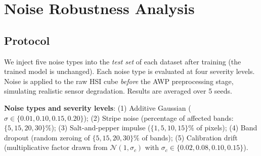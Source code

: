 \documentclass[conference]{IEEEtran}
\begin{document}
\begin{table}[!t]
\caption{Unified Efficiency Comparison}
\label{tab:efficiency_unified}
\centering
{}
\end{table}

\section{Noise Robustness Analysis}

\subsection{Protocol}

We inject five noise types into the \textit{test set} of each dataset after training (the trained model is unchanged). Each noise type is evaluated at four severity levels. Noise is applied to the raw HSI cube \textit{before} the AWP preprocessing stage, simulating realistic sensor degradation. Results are averaged over 5 seeds.

\textbf{Noise types and severity levels}: (1) Additive Gaussian ($\sigma \in \{0.01, 0.10, 0.15, 0.20\}$); (2) Stripe noise (percentage of affected bands: $\{5, 15, 20, 30\}\%$); (3) Salt-and-pepper impulse ($\{1, 5, 10, 15\}\%$ of pixels); (4) Band dropout (random zeroing of $\{5, 15, 20, 30\}\%$ of bands); (5) Calibration drift (multiplicative factor drawn from $\mathcal{N}(1, \sigma_c)$ with $\sigma_c \in \{0.02, 0.08, 0.10, 0.15\}$).
\end{document}
